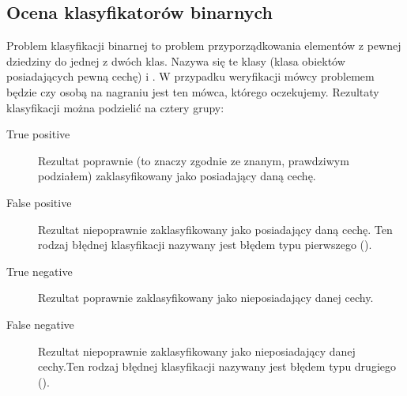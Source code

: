 %
%
%
%
%



\subsection{Ocena klasyfikatorów binarnych}

Problem klasyfikacji binarnej to problem przyporządkowania elementów z
pewnej dziedziny do jednej z dwóch klas. Nazywa się te klasy
 (klasa obiektów posiadających pewną cechę) i .
W przypadku weryfikacji mówcy problemem będzie czy osobą na nagraniu jest ten mówca, którego oczekujemy.
Rezultaty klasyfikacji można podzielić na cztery grupy:

\begin{description}
    \item[True positive] Rezultat poprawnie (to znaczy zgodnie ze znanym, prawdziwym podziałem) zaklasyfikowany jako posiadający daną cechę.
    \item[False positive] Rezultat niepoprawnie zaklasyfikowany jako posiadający daną cechę. Ten rodzaj błędnej klasyfikacji nazywany jest błędem typu pierwszego ().
    \item[True negative] Rezultat poprawnie zaklasyfikowany jako nieposiadający danej cechy.
    \item[False negative] Rezultat niepoprawnie zaklasyfikowany jako nieposiadający danej cechy.Ten rodzaj błędnej klasyfikacji nazywany jest błędem typu drugiego ().
\end{description}

